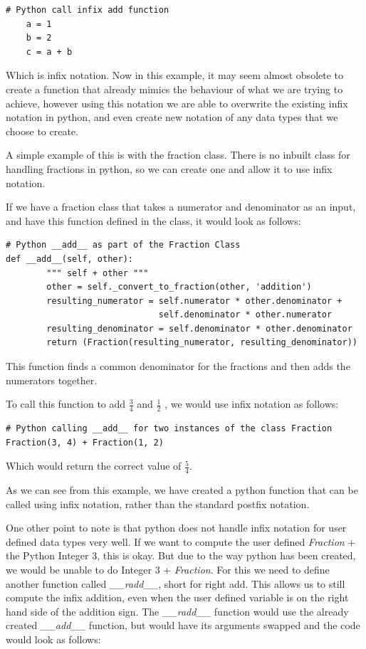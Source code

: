 \documentclass{article}
\begin{document}
\begin{lstlisting}
# Python call infix add function
    a = 1
    b = 2
    c = a + b
\end{lstlisting}

Which is infix notation. Now in this example, it may seem almost obsolete to create a function that already mimics the behaviour of what we are trying to achieve, however using this notation we are able to overwrite the existing infix notation in python, and even create new notation of any data types that we choose to create.

A simple example of this is with the fraction class. There is no inbuilt class for handling fractions in python, so we can create one and allow it to use infix notation.

If we have a fraction class that takes a numerator and denominator as an input, and have this function defined in the class, it would look as follows:


\begin{lstlisting}
# Python __add__ as part of the Fraction Class
def __add__(self, other):
        """ self + other """
        other = self._convert_to_fraction(other, 'addition')
        resulting_numerator = self.numerator * other.denominator +
                              self.denominator * other.numerator
        resulting_denominator = self.denominator * other.denominator
        return (Fraction(resulting_numerator, resulting_denominator))
\end{lstlisting}

This function finds a common denominator for the fractions and then adds the numerators together.

To call this function to add $\frac{3}{4}$ and $\frac{1}{2}$ , we would use infix notation as follows:


\begin{lstlisting}
# Python calling __add__ for two instances of the class Fraction
Fraction(3, 4) + Fraction(1, 2)
\end{lstlisting}

Which would return the correct value of $\frac{5}{4}$.

As we can see from this example, we have created a python function that can be called using infix notation, rather than the standard postfix notation.

One other point to note is that python does not handle infix notation for user defined data types very well. If we want to compute the user defined \textit{Fraction} + the Python Integer $3$, this is okay. But due to the way python has been created, we would be unable to do Integer $3$ + \textit{Fraction}. For this we need to define another function called \textit{\_\_radd\_\_}, short for right add. This allows us to still compute the infix addition, even when the user defined variable is on the right hand side of the addition sign. The \textit{\_\_radd\_\_} function would use the already created \textit{\_\_add\_\_} function, but would have its arguments swapped and the code would look as follows:
\end{document}
